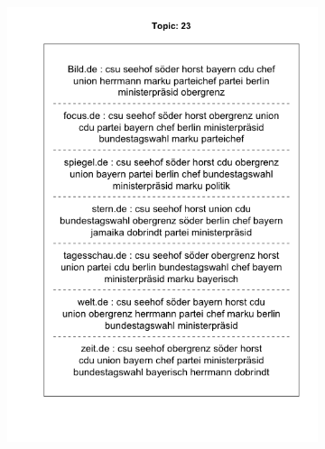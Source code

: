 \documentclass[12pt,a4paper,notitlepage]{article}
\begin{document}
\begin{figure}[H]
\begin{center}
\begin{subfigure}[normla]{0.49\textwidth}
			\includegraphics[width=\textwidth]{figs/plotquote23.png}
		\end{subfigure}
	\end{center}
\end{figure}
\end{document}
